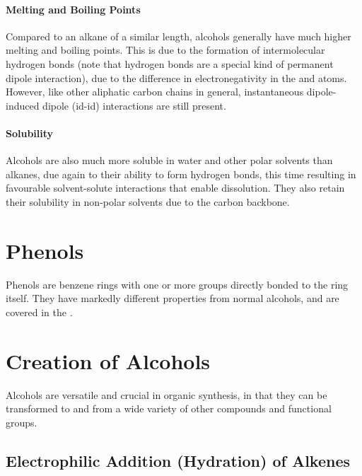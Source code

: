 			\paragraph{Melting and Boiling Points}

			Compared to an alkane of a similar length, alcohols generally have much higher melting and boiling points. This is due to
			the formation of intermolecular hydrogen bonds (note that hydrogen bonds are a special kind of permanent dipole interaction),
			due to the difference in electronegativity in the  and  atoms. However, like other aliphatic carbon chains in
			general, instantaneous dipole-induced dipole (id-id) interactions are still present.


			\paragraph{Solubility}

			Alcohols are also much more soluble in water and other polar solvents than alkanes, due again to their ability to form hydrogen
			bonds, this time resulting in favourable solvent-solute interactions that enable dissolution. They also retain their
			solubility in non-polar solvents due to the carbon backbone.


	\pagebreak
	\section{Phenols}

		Phenols are benzene rings with one or more  groups directly bonded to the ring itself. They have markedly different properties
		from normal alcohols, and are covered in the \hyperlink{ChapterPhenols}{}.




	\section{Creation of Alcohols}

		Alcohols are versatile and crucial in organic synthesis, in that they can be transformed to and from a wide variety of other
		compounds and functional groups.

		\subsection{Electrophilic Addition (Hydration) of Alkenes}


